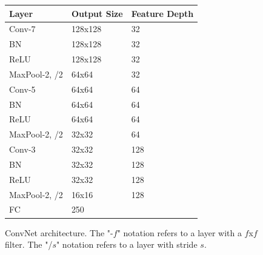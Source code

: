\documentclass[10pt,twocolumn,letterpaper]{article}
\begin{document}
\begin{figure}[h]
\begin{center}
\begin{tabular}{l | l | l}
Layer & Output Size & Feature Depth \\ \hline \hline
Conv-7 & 128x128 & 32 \\
BN & 128x128 & 32 \\
ReLU & 128x128 & 32 \\
MaxPool-2, /2 & 64x64 & 32 \\ 
Conv-5 & 64x64 & 64 \\
BN & 64x64 & 64 \\
ReLU & 64x64 & 64 \\
MaxPool-2, /2 & 32x32 & 64 \\ 
Conv-3 & 32x32 & 128 \\
BN & 32x32 & 128 \\
ReLU & 32x32 & 128 \\
MaxPool-2, /2 & 16x16 & 128 \\
FC & 250 &
\end{tabular}
\caption{ConvNet architecture. The "-$f$" notation refers to a layer with a $f$x$f$ filter. The "/$s$" notation refers to a layer with stride $s$.}
\end{center}
\end{figure}

{\small


}
\end{document}
